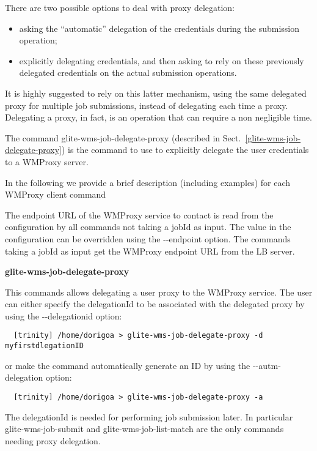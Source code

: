 There are two possible options to deal with proxy delegation:

\begin{itemize}

\item
asking the ``automatic'' delegation of the credentials during
the submission operation;

\item
explicitly delegating credentials, and then
asking to rely on these previously delegated credentials on the actual
submission operations.

\end{itemize}
                                                                             
It is highly suggested 
to rely on this latter mechanism, using the same delegated
proxy for multiple job submissions, instead of delegating each time a proxy.
Delegating a proxy, in fact, is an operation that can require a non
negligible time.

The command glite-wms-job-delegate-proxy (described in
Sect.~\ref{glite-wms-job-delegate-proxy}) is the command to use to
explicitly delegate the user credentials to a WMProxy server.

\medskip

In the following we provide a brief description (including
examples) for each WMProxy client command

The endpoint URL of the WMProxy service to contact is read from the configuration by all commands not
taking a jobId as input. The value in the configuration can be overridden using the -{}-endpoint  option.
The commands taking a jobId as input get the WMProxy endpoint URL from the LB server.



\textbf{glite-wms-job-delegate-proxy}

  This commands allows delegating a user proxy to the WMProxy service. The user can either specify
  the delegationId to be associated with the delegated proxy by using the -{}-delegationid  option:
\begin{scriptsize}
\begin{verbatim}
  [trinity] /home/dorigoa > glite-wms-job-delegate-proxy -d myfirstdlegationID
\end{verbatim}
\end{scriptsize}
  or make the command automatically generate an ID by using the -{}-autm-delegation  option:
\begin{scriptsize}
\begin{verbatim}
  [trinity] /home/dorigoa > glite-wms-job-delegate-proxy -a
\end{verbatim}
\end{scriptsize}
  The delegationId is needed for performing job submission later. In particular glite-wms-job-submit and
  glite-wms-job-list-match are the only commands needing proxy delegation.


